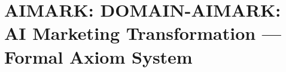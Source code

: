 %
%

\chapter{AIMARK: DOMAIN-AIMARK: AI Marketing Transformation --- Formal Axiom System}
\label{app:aimark}

\begin{abstract}
This appendix provides the complete formal axiom system for the AI Marketing
Transformation Model (MOD-UBS-AIMARK-001). The model integrates four modules
--- AI Value Chain, Customer Scenarios, Organization Transformation, and
Strategic Roadmap --- into a unified framework for behavioral analysis of
AI-driven marketing transformation in wealth management. We present 20 axioms
(AIM-1 through AIM-20), 12 definitions, and 8 propositions, all validated
via Monte Carlo simulation with 10,000 draws.
\end{abstract}


